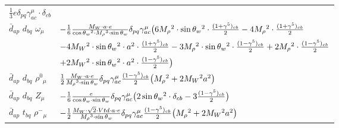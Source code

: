 \begin{center}
\begin{tabular}{|l|l|}
	$\frac{1}{3} e\delta_{p q} \gamma_{a c}^\mu \cdot \delta_{c b} $\\[2mm]
$\bar{d}{}_{a p }$ \phantom{-} $d{}_{b q }$ \phantom{-} $\omega{}_{\mu }$ \phantom{-}  &
	$-\frac{1}{6}\frac{ M_W \cdot a \cdot e}{ \cos{\theta}_w{}^2  \cdot M_\rho{}^3  \cdot \sin{\theta}_w}\delta_{p q} \gamma_{a c}^\mu \big(6 M_\rho{}^2 \cdot  \sin{\theta}_w{}^2 \cdot {(1+\gamma^5)_{c b}\over 2} -4 M_\rho{}^2 \cdot {(1+\gamma^5)_{c b}\over 2} $ \\[2mm]
  & $-4 M_W{}^2 \cdot  \sin{\theta}_w{}^2 \cdot  a{}^2 \cdot {(1+\gamma^5)_{c b}\over 2} -3 M_\rho{}^2 \cdot  \sin{\theta}_w{}^2 \cdot {(1-\gamma^5)_{c b}\over 2} +2 M_\rho{}^2 \cdot {(1-\gamma^5)_{c b}\over 2} $ \\[2mm]
  & $+2 M_W{}^2 \cdot  \sin{\theta}_w{}^2 \cdot  a{}^2 \cdot {(1-\gamma^5)_{c b}\over 2} \big)$\\[2mm]
$\bar{d}{}_{a p }$ \phantom{-} $d{}_{b q }$ \phantom{-} $\rho^0{}_{\mu }$ \phantom{-}  &
	$\frac{1}{2}\frac{ M_W \cdot a \cdot e}{ M_\rho{}^3  \cdot \sin{\theta}_w}\delta_{p q} \gamma_{a c}^\mu {(1-\gamma^5)_{c b}\over 2} \big( M_\rho{}^2 +2 M_W{}^2  a{}^2 \big)$\\[2mm]
$\bar{d}{}_{a p }$ \phantom{-} $d{}_{b q }$ \phantom{-} ${Z}_{\mu }$ \phantom{-}  &
	$-\frac{1}{6}\frac{ e}{ \cos{\theta}_w \cdot \sin{\theta}_w}\delta_{p q} \gamma_{a c}^\mu \big(2 \sin{\theta}_w{}^2 \cdot \delta_{c b} -3{(1-\gamma^5)_{c b}\over 2} \big)$\\[2mm]
$\bar{d}{}_{a p }$ \phantom{-} $t{}_{b q }$ \phantom{-} $\rho^-{}_{\mu }$ \phantom{-}  &
	$-\frac{1}{2}\frac{ M_W \cdot\sqrt{2} \cdot Vtd \cdot a \cdot e}{ M_\rho{}^3  \cdot \sin{\theta}_w}\delta_{p q} \gamma_{a c}^\mu {(1-\gamma^5)_{c b}\over 2} \big( M_\rho{}^2 +2 M_W{}^2  a{}^2 \big)$\\ \hline
\end{tabular}


\end{center}
